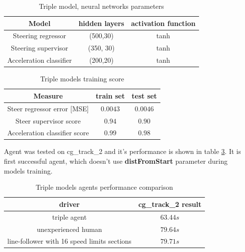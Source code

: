 \documentclass[declaration,shortabstract,english,inz]{iithesis}
\begin{document}
\begin{table}[h]
    \centering
    \begin{tabular}{ |c|c|c|}
          \hline
          \textbf{Model} & \textbf{hidden layers} & \textbf{activation function} \\
          \hline
          Steering regressor & (500,30) &  tanh  \\
          \hline
          Steering supervisor &  (350, 30) & tanh \\
          \hline
          Acceleration classifier & (200,20) & tanh \\
          \hline
        \end{tabular}
        \caption{Triple model, neural networks parameters}
        \label{tab:triple_models_nn_params}
\end{table}

\begin{table}[h]
    \centering
    \begin{tabular}{ |c|c|c|}
          \hline
          \textbf{Measure} &  \textbf{train set} & \textbf{test set} \\
          \hline
          Steer regressor error [MSE] & $0.0043$ & $0.0046$\\
          \hline
          Steer supervisor score &  $0.94$ & $0.90$ \\
          \hline
          Acceleration classifier score   & $0.99$ & $0.98$ \\
          \hline       
        \end{tabular}
        \caption{Triple models training score}
        \label{tab:triple_models_learning_results}
\end{table}

Agent was tested on cg\_track\_2 and it's performance is shown in table \ref{tab:triple_models_results}.
It is first successful agent, which doesn't use \textbf{distFromStart} parameter during models training.




\begin{table}[h]
    \centering
    \begin{tabular}{ |c|c|}
          \hline
           \textbf{driver} & \textbf{cg\_track\_2 result} \\
           \hline
           triple agent & $63.44s$  \\
           \hline
          unexperienced human & $79.64s$ \\
          \hline       
          line-follower with 16 speed limits sections & $79.71s$ \\
        \hline
        \end{tabular}
        \caption{Triple models agents performance comparison}
        \label{tab:triple_models_results}

\end{table}
\end{document}
